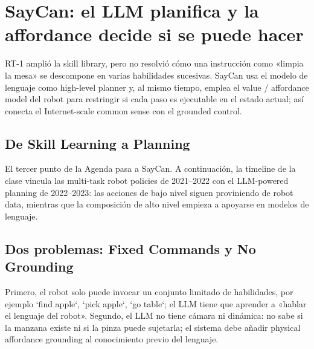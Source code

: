 \section{SayCan: el LLM planifica y la affordance decide si se puede hacer}

RT-1 amplió la skill library, pero no resolvió cómo una instrucción como «limpia la mesa» se descompone en varias habilidades sucesivas. SayCan usa el modelo de lenguaje como high-level planner y, al mismo tiempo, emplea el value / affordance model del robot para restringir si cada paso es ejecutable en el estado actual; así conecta el Internet-scale common sense con el grounded control.

\subsection{De Skill Learning a Planning}

El tercer punto de la Agenda pasa a SayCan. A continuación, la timeline de la clase vincula las multi-task robot policies de 2021--2022 con el LLM-powered planning de 2022--2023: las acciones de bajo nivel siguen proviniendo de robot data, mientras que la composición de alto nivel empieza a apoyarse en modelos de lenguaje.



\subsection{Dos problemas: Fixed Commands y No Grounding}

Primero, el robot solo puede invocar un conjunto limitado de habilidades, por ejemplo `find apple`, `pick apple`, `go table`; el LLM tiene que aprender a «hablar el lenguaje del robot». Segundo, el LLM no tiene cámara ni dinámica: no sabe si la manzana existe ni si la pinza puede sujetarla; el sistema debe añadir physical affordance grounding al conocimiento previo del lenguaje.


